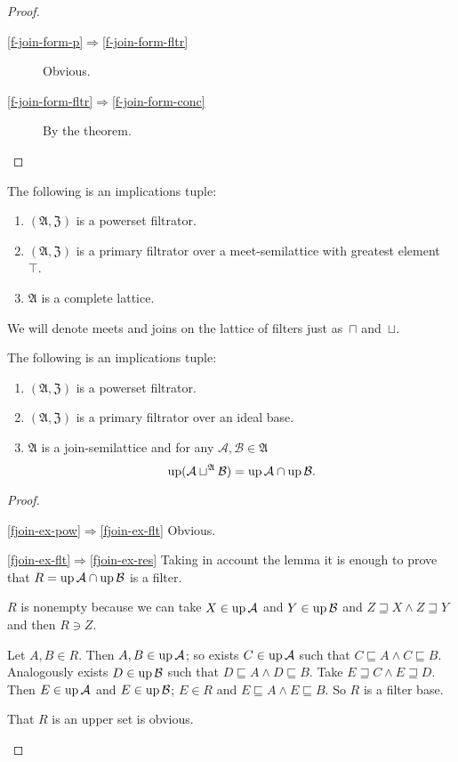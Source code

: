 \begin{proof}
~
\begin{description}
\item [{\ref{f-join-form-p}$\Rightarrow$\ref{f-join-form-fltr}}] Obvious.
\item [{\ref{f-join-form-fltr}$\Rightarrow$\ref{f-join-form-conc}}] By
the theorem.
\end{description}
\end{proof}
\begin{cor}
\label{filt-is-complete}The following is an implications tuple:
\begin{enumerate}
\item $(\mathfrak{A},\mathfrak{Z})$ is a powerset filtrator.
\item $(\mathfrak{A},\mathfrak{Z})$ is a primary filtrator over a meet-semilattice
with greatest element~$\top$.
\item $\mathfrak{A}$ is a complete lattice.
\end{enumerate}
\end{cor}

We will denote meets and joins on the lattice of filters just as~$\sqcap$ and~$\sqcup$.
\begin{prop}\label{filt-meet-form} 
The following is an implications tuple:
\begin{enumerate}
  \item\label{fjoin-ex-pow} $(\mathfrak{A},\mathfrak{Z})$ is a powerset filtrator.
  \item\label{fjoin-ex-flt}  $(\mathfrak{A},\mathfrak{Z})$ is a primary filtrator
    over an ideal base.
  \item\label{fjoin-ex-res}  $\mathfrak{A}$ is a join-semilattice and for
    any $\mathcal{A},\mathcal{B}\in\mathfrak{A}$
\[
\operatorname{up}(\mathcal{A}\sqcup^{\mathfrak{A}}\mathcal{B})=\operatorname{up}\mathcal{A}\cap\operatorname{up}\mathcal{B}.
\]
\end{enumerate}
\end{prop}

\begin{proof}
~
\begin{widedisorder}
\item[\ref{fjoin-ex-pow}$\Rightarrow$\ref{fjoin-ex-flt}]
  Obvious.
\item[\ref{fjoin-ex-flt}$\Rightarrow$\ref{fjoin-ex-res}]
  Taking in account the lemma it is enough to prove that $R = \operatorname{up}
  \mathcal{A} \cap \operatorname{up} \mathcal{B}$ is a filter.

  $R$ is nonempty because we can take $X \in \operatorname{up} \mathcal{A}$ and $Y \in
  \operatorname{up} \mathcal{B}$ and $Z\sqsupseteq X\land Z\sqsupseteq Y$ and then $R \ni Z$.

  Let $A, B \in R$. Then $A, B \in \operatorname{up} \mathcal{A}$; so exists $C \in
  \operatorname{up} \mathcal{A}$ such that $C \sqsubseteq A \land C \sqsubseteq B$.
  Analogously exists $D \in \operatorname{up} \mathcal{B}$ such that $D \sqsubseteq A \land
  D \sqsubseteq B$. Take $E\sqsupseteq C\land E\sqsupseteq D$. Then $E \in \operatorname{up}
  \mathcal{A}$ and $E \in \operatorname{up} \mathcal{B}$; $E \in R$ and $E \sqsubseteq A \land
  E \sqsubseteq B$. So $R$ is a filter base.

  That $R$ is an upper set is obvious.
\end{widedisorder}
\end{proof}

